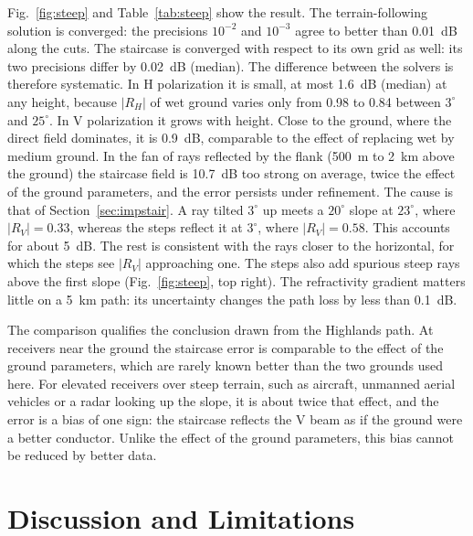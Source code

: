 \documentclass[journal]{IEEEtran}
\begin{document}
Fig.~\ref{fig:steep} and Table~\ref{tab:steep} show the result. The
terrain-following solution is converged: the precisions $10^{-2}$ and
$10^{-3}$ agree to better than \SI{0.01}{dB} along the cuts. The staircase is
converged with respect to its own grid as well: its two precisions differ by
\SI{0.02}{dB} (median). The difference between the solvers is therefore
systematic. In H polarization it is small, at most \SI{1.6}{dB} (median) at any height,
because $|R_H|$ of wet ground varies only from 0.98 to 0.84 between $3^\circ$
and $25^\circ$. In V polarization it grows with height. Close to the ground,
where the direct field dominates, it is \SI{0.9}{dB}, comparable to the effect of
replacing wet by medium ground. In the fan of rays reflected by the flank
(\SI{500}{m} to \SI{2}{km} above the ground) the staircase field is
\SI{10.7}{dB} too strong on average, twice the effect of the ground
parameters, and the error persists under refinement. The cause is that of
Section~\ref{sec:impstair}. A ray tilted $3^\circ$ up meets a $20^\circ$ slope at
$23^\circ$, where $|R_V|=0.33$, whereas the steps reflect it at $3^\circ$, where
$|R_V|=0.58$. This accounts for about \SI{5}{dB}. The rest is consistent with
the rays closer to the horizontal, for which the steps see $|R_V|$ approaching
one. The steps
also add spurious steep rays above the first slope (Fig.~\ref{fig:steep}, top
right). The refractivity gradient matters little on a \SI{5}{km} path: its
uncertainty changes the path loss by less than \SI{0.1}{dB}.

The comparison qualifies the conclusion drawn from the Highlands path. At
receivers near the ground the staircase error is comparable to the effect of
the ground parameters, which are rarely known better than the two grounds used
here. For elevated receivers over steep terrain, such as aircraft, unmanned
aerial vehicles or a radar looking up the slope, it is about twice that
effect, and the error is a bias of one sign: the staircase reflects the V
beam as if the ground were a better conductor. Unlike the effect of the
ground parameters, this bias cannot be reduced by better data.

\section{Discussion and Limitations}
\end{document}
